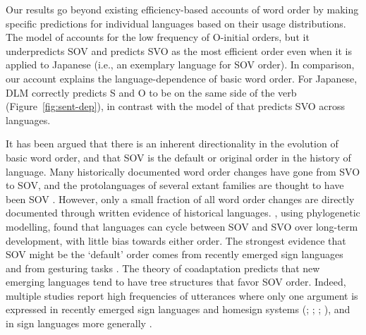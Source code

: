 \documentclass[11pt,a4paper]{article}
\begin{document}
Our results go beyond existing efficiency-based accounts of word order by making specific predictions for individual languages based on their usage distributions.
The model of \cite{maurits2010why} accounts for the low frequency of O-initial orders, but it underpredicts SOV and predicts SVO as the most efficient order even when it is applied to Japanese (i.e., an exemplary language for SOV order).
In comparison, our account explains the language-dependence of basic word order.
For Japanese, DLM correctly predicts S and O to be on the same side of the verb (Figure~\ref{fig:sent-dep}), in contrast with the model of \cite{maurits2010why} that predicts SVO across languages. %

It has been argued that there is an inherent directionality in the evolution of basic word order, and that SOV is the default or original order in the history of language.
Many historically documented word order changes have gone from SVO to SOV, and the protolanguages of several extant families are thought to have been SOV \citep{givon1979understanding, newmeyer2000evolutionary, maurits2014tracing}.
However, only a small fraction of all word order changes are directly documented through written evidence of historical languages.
\cite{maurits2014tracing}, using phylogenetic modelling, found that languages can cycle between SOV and SVO over long-term development, with little bias towards either order.
The strongest evidence that SOV might be the `default' order comes from recently emerged sign languages \citep{senghas1997argument, sandler2005emergence, goldin-meadow1998spontaneous, meir2010emerging} and from gesturing tasks \citep{goldin-meadow2008natural, langus2010cognitive}.
The theory of coadaptation predicts that new emerging languages tend to have tree structures that favor SOV order.
Indeed, multiple studies report high frequencies of utterances where only one argument is expressed in recently emerged sign languages and homesign systems (\citet{sandler2005emergence}; \citet{goldin-meadow1998spontaneous}; \citet[p. 31]{neveu2016sign}; \citet[p. 622]{ergin2018development}), and in sign languages more generally \citep{napoli2014order}.
\end{document}
